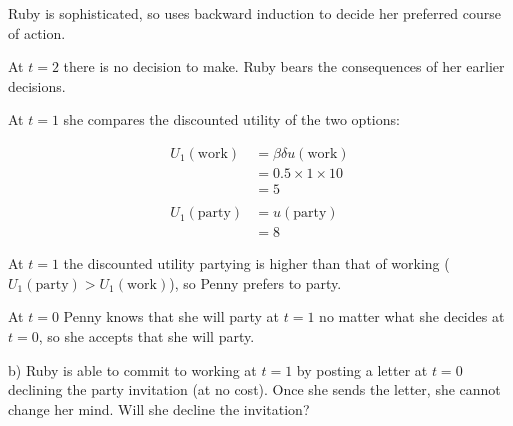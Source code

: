\documentclass[
  letterpaper,
  DIV=11,
  numbers=noendperiod]{scrreprt}
\begin{document}
\begin{tcolorbox}[enhanced jigsaw, title=\textcolor{quarto-callout-tip-color}{\faLightbulb}\hspace{0.5em}{Answer}, toprule=.15mm, colback=white, breakable, titlerule=0mm, colframe=quarto-callout-tip-color-frame, coltitle=black, opacityback=0, rightrule=.15mm, colbacktitle=quarto-callout-tip-color!10!white, bottomtitle=1mm, opacitybacktitle=0.6, arc=.35mm, bottomrule=.15mm, toptitle=1mm, leftrule=.75mm, left=2mm]

Ruby is sophisticated, so uses backward induction to decide her
preferred course of action.

At \(t=2\) there is no decision to make. Ruby bears the consequences of
her earlier decisions.

At \(t=1\) she compares the discounted utility of the two options:

\begin{align*}
U_1(\text{work})&=\beta\delta u(\text{work}) \\
&=0.5\times 1\times 10 \\
&=5 \\
\\
U_1(\text{party})&=u(\text{party}) \\
&=8
\end{align*}

At \(t=1\) the discounted utility partying is higher than that of
working (\(U_1(\text{party})>U_1(\text{work})\)), so Penny prefers to
party.

At \(t=0\) Penny knows that she will party at \(t=1\) no matter what she
decides at \(t=0\), so she accepts that she will party.

\end{tcolorbox}

b) Ruby is able to commit to working at \(t=1\) by posting a letter at
\(t=0\) declining the party invitation (at no cost). Once she sends the
letter, she cannot change her mind. Will she decline the invitation?
\end{document}
